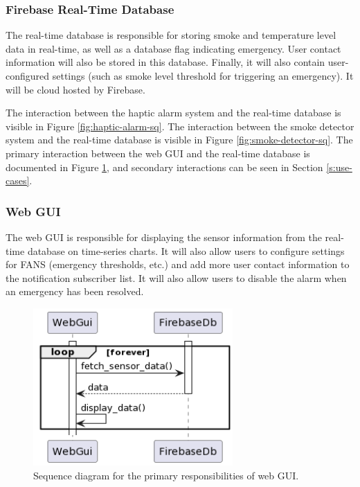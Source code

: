 \subsubsection{Firebase Real-Time Database}

The real-time database is responsible for storing smoke and temperature level data in real-time, as well as a database
flag indicating emergency. User contact information will also be stored in this database. Finally, it will also contain
user-configured settings (such as smoke level threshold for triggering an emergency). It will be cloud hosted by
Firebase.

The interaction between the haptic alarm system and the real-time database is visible in Figure
\ref{fig:haptic-alarm-sq}. The interaction between the smoke detector system and the real-time database is visible in
Figure \ref{fig:smoke-detector-sq}. The primary interaction between the web GUI and the real-time database is
documented in Figure \ref{fig:webui-sq}, and secondary interactions can be seen in Section \ref{s:use-cases}.

\subsubsection{Web GUI}

The web GUI is responsible for displaying the sensor information from the real-time database on time-series charts. It
will also allow users to configure settings for FANS (emergency thresholds, etc.) and add more user contact information
to the notification subscriber list. It will also allow users to disable the alarm when an emergency has been resolved.

\begin{figure}[H]
    \centering
    \includegraphics[width=3in]{../assets/WebGUiSequence.png}
    \caption{Sequence diagram for the primary responsibilities of web GUI.}
    \label{fig:webui-sq}
\end{figure}

